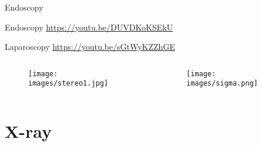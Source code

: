 \begin{frame}[c]{Endoscopy}

	Endoscopy \href{https://youtu.be/DUVDKoKSEkU}{https://youtu.be/DUVDKoKSEkU}

	Laparoscopy \href{https://youtu.be/sGtWyKZZhGE}{https://youtu.be/sGtWyKZZhGE}
	\begin{columns}[t, onlytextwidth]
		\begin{column}{0.5\textwidth}

			\begin{figure}
				\texttt{[image: images/stereo1.jpg]}
			\end{figure}
		\end{column}\begin{column}{0.5\textwidth}
			\begin{figure}
				\texttt{[image: images/sigma.png]}
			\end{figure}
		\end{column}
	\end{columns}
\end{frame}


\section{X-ray}




